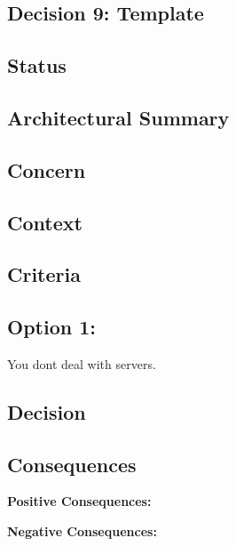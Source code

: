 \subsection{Decision 9: Template}

\subsection*{Status}

\subsection*{Architectural Summary}


\subsection*{Concern}


\subsection*{Context}


\subsection*{Criteria}
\begin{itemize}
\end{itemize}

\subsection*{Option 1: }
You dont deal with servers.

\subsection*{Decision}

\subsection*{Consequences}
\textbf{Positive Consequences:}
\begin{itemize}
\end{itemize}
\textbf{Negative Consequences:}
\begin{itemize}
\end{itemize}